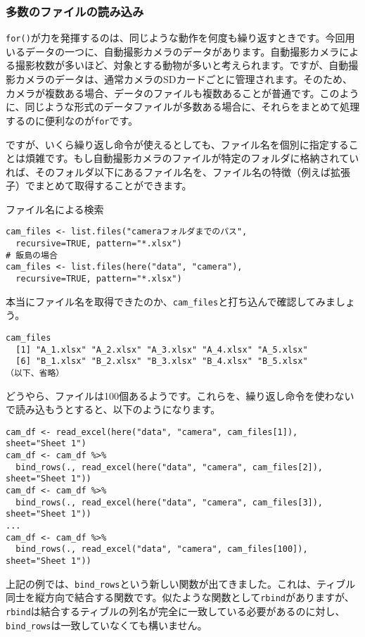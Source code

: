     \subsubsection{多数のファイルの読み込み}
\verb|for()|が力を発揮するのは、同じような動作を何度も繰り返すときです。今回用いるデータの一つに、自動撮影カメラのデータがあります。自動撮影カメラによる撮影枚数が多いほど、対象とする動物が多いと考えられます。ですが、自動撮影カメラのデータは、通常カメラのSDカードごとに管理されます。そのため、カメラが複数ある場合、データのファイルも複数あることが普通です。このように、同じような形式のデータファイルが多数ある場合に、それらをまとめて処理するのに便利なのが\verb|for|です。

ですが、いくら繰り返し命令が使えるとしても、ファイル名を個別に指定することは煩雑です。もし自動撮影カメラのファイルが特定のフォルダに格納されていれば、そのフォルダ以下にあるファイル名を、ファイル名の特徴（例えば拡張子）でまとめて取得することができます。
\begin{itembox}[l]{ファイル名による検索}
\begin{verbatim}
cam_files <- list.files("cameraフォルダまでのパス",
  recursive=TRUE, pattern="*.xlsx")
# 飯島の場合
cam_files <- list.files(here("data", "camera"),
  recursive=TRUE, pattern="*.xlsx")
\end{verbatim}
\end{itembox}

本当にファイル名を取得できたのか、\verb|cam_files|と打ち込んで確認してみましょう。
\begin{verbatim}
cam_files
  [1] "A_1.xlsx" "A_2.xlsx" "A_3.xlsx" "A_4.xlsx" "A_5.xlsx"
  [6] "B_1.xlsx" "B_2.xlsx" "B_3.xlsx" "B_4.xlsx" "B_5.xlsx"
（以下、省略）
\end{verbatim}

どうやら、ファイルは100個あるようです。これらを、繰り返し命令を使わないで読み込もうとすると、以下のようになります。
\begin{verbatim}
cam_df <- read_excel(here("data", "camera", cam_files[1]), sheet="Sheet 1")
cam_df <- cam_df %>%
  bind_rows(., read_excel(here("data", "camera", cam_files[2]), sheet="Sheet 1"))
cam_df <- cam_df %>%
  bind_rows(., read_excel(here("data", "camera", cam_files[3]), sheet="Sheet 1"))
...
cam_df <- cam_df %>%
  bind_rows(., read_excel("data", "camera", cam_files[100]), sheet="Sheet 1"))
\end{verbatim}
上記の例では、\verb|bind_rows|という新しい関数が出てきました。これは、ティブル同士を縦方向で結合する関数です。似たような関数として\verb|rbind|がありますが、\verb|rbind|は結合するティブルの列名が完全に一致している必要があるのに対し、\verb|bind_rows|は一致していなくても構いません。

